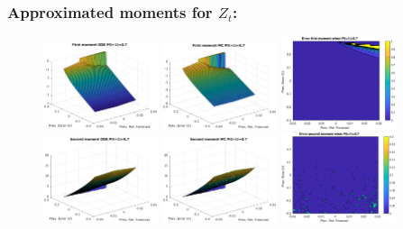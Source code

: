 \documentclass[aspectratio=169]{beamer}\usepackage[utf8]{inputenc}
\begin{document}
\begin{frame}\frametitle{Approximated moments for $Z_t$:}

\begin{figure}[ht!]
\centering
\includegraphics[width=0.3\textwidth]{../../MATLAB_Files/Results/moments/lamperti/errors/fm_ODE_6.eps}\quad
\includegraphics[width=0.3\textwidth]{../../MATLAB_Files/Results/moments/lamperti/errors/fm_MC_6.eps}\quad
\includegraphics[width=0.3\textwidth]{../../MATLAB_Files/Results/moments/lamperti/errors/fm_6.eps}\quad
\includegraphics[width=0.3\textwidth]{../../MATLAB_Files/Results/moments/lamperti/errors/sm_ODE_6.eps}\quad
\includegraphics[width=0.3\textwidth]{../../MATLAB_Files/Results/moments/lamperti/errors/sm_MC_6.eps}\quad
\includegraphics[width=0.3\textwidth]{../../MATLAB_Files/Results/moments/lamperti/errors/sm_6.eps}
\end{figure}

\end{frame}
\end{document}
